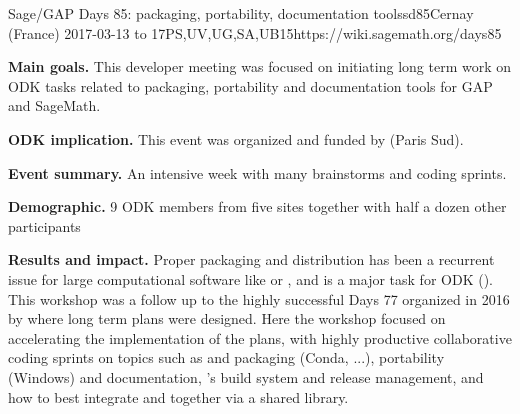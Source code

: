 \begin{event}{Sage/GAP Days 85: packaging, portability, documentation tools}{sd85}{Cernay (France) 2017-03-13 to 17}{PS,UV,UG,SA,UB}{15}{https://wiki.sagemath.org/days85}

  \textbf{Main goals.} This developer meeting was focused on
  initiating long term work on ODK tasks related to packaging,
  portability and documentation tools for GAP and SageMath.

  \textbf{ODK implication.} This event was organized and funded by
  \ODK (Paris Sud).

  \textbf{Event summary.} An intensive week with many brainstorms and coding sprints.

  \textbf{Demographic.} 9 ODK members from five sites together with
  half a dozen other participants

  \textbf{Results and impact.} Proper packaging and distribution has
  been a recurrent issue for large computational software like \Sage
  or \GAP, and is a major task for ODK
  (). This workshop
  was a follow up to the highly successful \Sage Days 77 organized in
  2016 by \ODK where long term plans were designed. Here the workshop
  focused on accelerating the implementation of the plans, with highly
  productive collaborative coding sprints on topics such as \GAP and
  \Sage packaging (Conda, ...), \Sage portability (Windows) and
  documentation, \GAP's build system and release management, and how
  to best integrate \GAP and \Sage together via a shared library.
\end{event}
